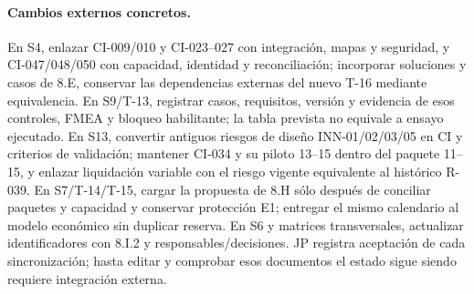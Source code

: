 \paragraph{Cambios externos concretos.} En S4, enlazar CI-009/010 y CI-023--027 con integración, mapas y seguridad, y CI-047/048/050 con capacidad, identidad y reconciliación; incorporar soluciones y casos de 8.E, conservar las dependencias externas del nuevo T-16 mediante equivalencia. En S9/T-13, registrar casos, requisitos, versión y evidencia de esos controles, FMEA y bloqueo habilitante; la tabla prevista no equivale a ensayo ejecutado. En S13, convertir antiguos riesgos de diseño INN-01/02/03/05 en CI y criterios de validación; mantener CI-034 y su piloto 13--15 dentro del paquete 11--15, y enlazar liquidación variable con el riesgo vigente equivalente al histórico R-039. En S7/T-14/T-15, cargar la propuesta de 8.H sólo después de conciliar paquetes y capacidad y conservar protección E1; entregar el mismo calendario al modelo económico sin duplicar reserva. En S6 y matrices transversales, actualizar identificadores con 8.I.2 y responsables/decisiones. JP registra aceptación de cada sincronización; hasta editar y comprobar esos documentos el estado sigue siendo requiere integración externa.
